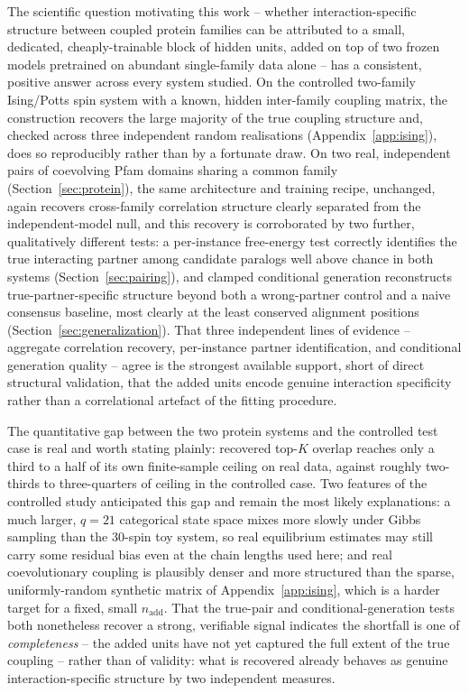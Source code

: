 \documentclass[11pt]{article}
\begin{document}
The scientific question motivating this work -- whether interaction-specific
structure between coupled protein families can be attributed to a small,
dedicated, cheaply-trainable block of hidden units, added on top of two
frozen models pretrained on abundant single-family data alone -- has a
consistent, positive answer across every system studied. On the controlled
two-family Ising/Potts spin system with a known, hidden inter-family
coupling matrix, the construction recovers the large majority of the true
coupling structure and, checked across three independent random
realisations (Appendix~\ref{app:ising}), does so reproducibly rather than
by a fortunate draw. On two real, independent pairs of coevolving Pfam
domains sharing a common family (Section~\ref{sec:protein}), the same
architecture and training recipe, unchanged, again recovers cross-family
correlation structure clearly separated from the independent-model null,
and this recovery is corroborated by two further, qualitatively different
tests: a per-instance free-energy test correctly identifies the true
interacting partner among candidate paralogs well above chance in both
systems (Section~\ref{sec:pairing}), and clamped conditional generation
reconstructs true-partner-specific structure beyond both a wrong-partner
control and a naive consensus baseline, most clearly at the least
conserved alignment positions (Section~\ref{sec:generalization}). That
three independent lines of evidence -- aggregate correlation recovery,
per-instance partner identification, and conditional generation quality --
agree is the strongest available support, short of direct structural
validation, that the added units encode genuine interaction specificity
rather than a correlational artefact of the fitting procedure.

The quantitative gap between the two protein systems and the controlled
test case is real and worth stating plainly: recovered top-$K$ overlap
reaches only a third to a half of its own finite-sample ceiling on real
data, against roughly two-thirds to three-quarters of ceiling in the
controlled case. Two features of the controlled study anticipated this
gap and remain the most likely explanations: a much larger, $q=21$
categorical state space mixes more slowly under Gibbs sampling than the
$30$-spin toy system, so real equilibrium estimates may still carry some
residual bias even at the chain lengths used here; and real coevolutionary
coupling is plausibly denser and more structured than the sparse,
uniformly-random synthetic matrix of Appendix~\ref{app:ising}, which is a
harder target for a fixed, small $n_{\mathrm{add}}$. That the true-pair
and conditional-generation tests both nonetheless recover a strong,
verifiable signal indicates the shortfall is one of \emph{completeness} --
the added units have not yet captured the full extent of the true
coupling -- rather than of validity: what is recovered already behaves as
genuine interaction-specific structure by two independent measures.
\end{document}
